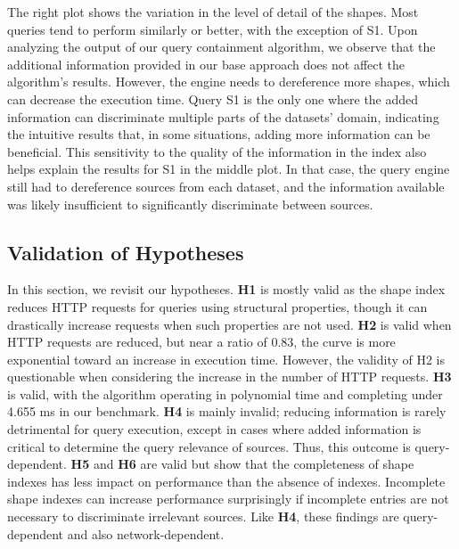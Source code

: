 The right plot shows the variation in the level of detail of the shapes.
Most queries tend to perform similarly or better, with the exception of S1.
Upon analyzing the output of our query containment algorithm, we observe that the additional information provided in our base approach does not affect the algorithm’s results.
However, the engine needs to dereference more shapes, which can decrease the execution time.
Query S1 is the only one where the added information can discriminate multiple parts of the datasets' domain, indicating the intuitive results that, in some situations, adding more information can be beneficial.
This sensitivity to the quality of the information in the index also helps explain the results for S1 in the middle plot. 
In that case, the query engine still had to dereference sources from each dataset, and the information available was likely insufficient to significantly discriminate between sources.

\subsection{Validation of Hypotheses}
In this section, we revisit our hypotheses.
\textbf{H1} is mostly valid as the shape index reduces HTTP requests for queries using structural properties, though it can drastically increase requests when such properties are not used.
\textbf{H2} is valid when HTTP requests are reduced, but near a ratio of 0.83, the curve is more exponential toward an increase in execution time.
However, the validity of H2 is questionable when considering the increase in the number of HTTP requests.
\textbf{H3} is valid, with the algorithm operating in polynomial time and completing under 4.655 ms in our benchmark.
\textbf{H4} is mainly invalid; reducing information is rarely detrimental for query execution, except in cases where added information is critical to determine the query relevance of sources.
Thus, this outcome is query-dependent.
\textbf{H5} and \textbf{H6} are valid but show that the completeness of shape indexes has less impact on performance than the absence of indexes.
Incomplete shape indexes can increase performance surprisingly if incomplete entries are not necessary to discriminate irrelevant sources. 
Like \textbf{H4}, these findings are query-dependent and also network-dependent.

